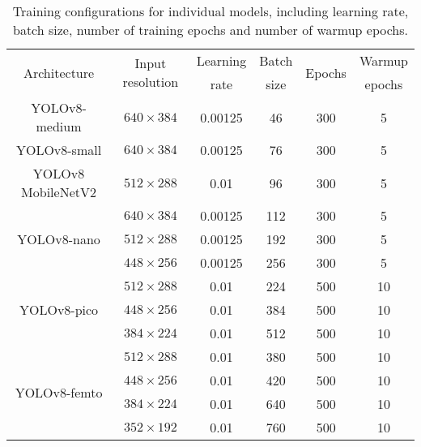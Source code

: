 \begin{table}[t]
    \centering
    \small
    \begin{threeparttable}
        \begin{tabular}{|c|c|c|c|c|c|}
            \hline
            \multirow{2}{*}{Architecture}& \multirow{2}{*}{Input resolution} & Learning & Batch & \multirow{2}{*}{Epochs} & Warmup \\
                                        &                                   & rate     & size  &                         & epochs \\
            \hline
            \hline
            YOLOv8-medium                & $640 \times 384$ & 0.00125 & 46  & 300 & 5 \\
            \hline
            YOLOv8-small                 & $640 \times 384$ & 0.00125 & 76  & 300 & 5 \\
            \hline
            YOLOv8 MobileNetV2           & $512 \times 288$ & 0.01    & 96  & 300 & 5 \\
            \hline
            \multirow{3}{*}{YOLOv8-nano} & $640 \times 384$ & 0.00125 & 112 & 300 & 5 \\
                                        & $512 \times 288$ & 0.00125 & 192 & 300 & 5 \\
                                        & $448 \times 256$ & 0.00125 & 256 & 300 & 5 \\
            \hline
            \multirow{3}{*}{YOLOv8-pico} & $512 \times 288$ & 0.01    & 224 & 500 & 10 \\
                                        & $448 \times 256$ & 0.01    & 384 & 500 & 10 \\
                                        & $384 \times 224$ & 0.01    & 512 & 500 & 10 \\
            \hline
            \multirow{4}{*}{YOLOv8-femto}& $512 \times 288$ & 0.01    & 380 & 500 & 10 \\
                                        & $448 \times 256$ & 0.01    & 420 & 500 & 10 \\
                                        & $384 \times 224$ & 0.01    & 640 & 500 & 10 \\
                                        & $352 \times 192$ & 0.01    & 760 & 500 & 10 \\
            \hline
        \end{tabular}
        \caption{Training configurations for individual models, including learning rate, batch size, number of training epochs and number of warmup epochs.}
        \label{ModelSpecificConfigurations}
    \end{threeparttable}
\end{table}


